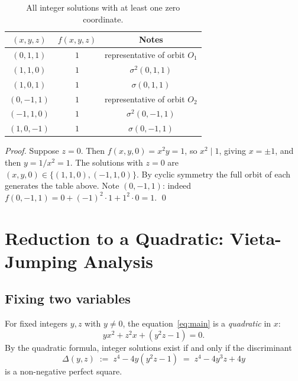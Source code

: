 \documentclass[12pt,a4paper]{article}
\theoremstyle{definition}
\begin{document}
\begin{table}[h]
\centering
\caption{All integer solutions with at least one zero coordinate.}
\label{tab:zero}
\begin{tabular}{ccc}
\toprule
$(x,y,z)$ & $f(x,y,z)$ & Notes \\
\midrule
$(0,1,1)$ & $1$ & representative of orbit $O_1$ \\
$(1,1,0)$ & $1$ & $\sigma^2(0,1,1)$ \\
$(1,0,1)$ & $1$ & $\sigma(0,1,1)$ \\
$(0,-1,1)$ & $1$ & representative of orbit $O_2$ \\
$(-1,1,0)$ & $1$ & $\sigma^2(0,-1,1)$ \\
$(1,0,-1)$ & $1$ & $\sigma(0,-1,1)$ \\
\bottomrule
\end{tabular}
\end{table}

\begin{proof}
  Suppose $z=0$.  Then $f(x,y,0) = x^2y = 1$, so $x^2 \mid 1$, giving
  $x = \pm 1$, and then $y = 1/x^2 = 1$.  The solutions with $z=0$ are
  $(x,y,0) \in \{(1,1,0),(-1,1,0)\}$.  By cyclic symmetry the full
  orbit of each generates the table above.  Note $(0,-1,1)$: indeed
  $f(0,-1,1) = 0 + (-1)^2\cdot 1 + 1^2\cdot 0 = 1$.  \qed
\end{proof}

\section{Reduction to a Quadratic: Vieta-Jumping Analysis}
\label{sec:vieta}

\subsection{Fixing two variables}

For fixed integers $y, z$ with $y \neq 0$, the equation~\eqref{eq:main}
is a \emph{quadratic} in $x$:
\begin{equation}\label{eq:quadratic_x}
  y x^2 + z^2 x + (y^2 z - 1) = 0.
\end{equation}
By the quadratic formula, integer solutions exist if and only if the
discriminant
\begin{equation}\label{eq:disc}
  \Delta(y,z) \;:=\; z^4 - 4y(y^2z - 1) \;=\; z^4 - 4y^3z + 4y
\end{equation}
is a non-negative perfect square.
\end{document}
